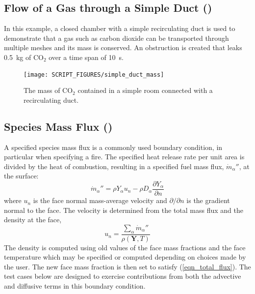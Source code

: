 \documentclass[11pt]{book}
\begin{document}
\subsection{Flow of a Gas through a Simple Duct (\texorpdfstring{}{simple\_duct})}
\label{simple_duct}

In this example, a closed chamber with a simple recirculating duct is used to demonstrate that a gas such as carbon dioxide can be transported
through multiple meshes and its mass is conserved. An obstruction is created that leaks 0.5~kg of CO$_2$ over a time span of 10~s.

\begin{figure}[ht]
\centering
\texttt{[image: SCRIPT\_FIGURES/simple\_duct\_mass]}
\caption[The  test case]{The mass of CO$_2$ contained in a simple room connected with a recirculating duct.}
\label{simple_duct_fig}
\end{figure}


\subsection{Species Mass Flux (\texorpdfstring{}{species\_conservation})}
\label{species_conservation_1}
\label{species_conservation_2}
\label{species_conservation_3}
\label{species_conservation_4}

A specified species mass flux is a commonly used boundary condition, in particular when specifying a fire.  The specified heat release rate per unit area is divided by the heat of combustion, resulting in a specified fuel mass flux, $\dot{m}_\alpha''$, at the surface:
\begin{equation}
\label{eqn_total_flux}
\dot{m}_{\alpha}'' = \rho Y_{\alpha} u_n - \rho D_\alpha \frac{\partial Y_\alpha}{\partial n}
\end{equation}
where $u_n$ is the face normal mass-average velocity and $\partial/\partial n$ is the gradient normal to the face.  The velocity is determined from the total mass flux and the density at the face,
\begin{equation}
\label{eqn_un}
u_n = \frac{\sum_\alpha \dot{m}_\alpha''}{\rho(\mathbf{Y},T)}
\end{equation}
The density is computed using old values of the face mass fractions and the face temperature which may be specified or computed depending on choices made by the user.  The new face mass fraction is then set to satisfy (\ref{eqn_total_flux}).  The test cases below are designed to exercise contributions from both the advective and diffusive terms in this boundary condition.
\end{document}
